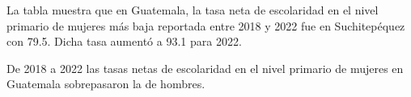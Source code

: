 \justifying La tabla muestra que en Guatemala, la tasa neta de escolaridad en el nivel primario de mujeres más baja reportada entre 2018 y 2022 fue en Suchitepéquez con 79.5. Dicha tasa aumentó a 93.1 para 2022.

De 2018 a 2022 las tasas netas de escolaridad en el nivel primario de mujeres en Guatemala sobrepasaron la de hombres. 